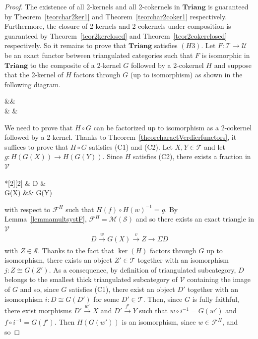 \documentclass[11pt,reqno,a4paper]{amsart}
\theoremstyle{definition}
\theoremstyle{remark}
\def\nameit#1{\textrm{#1}~}
\def\thex{\nameit{Theorem}}
\def\lemx{\nameit{Lemma}}
\newcommand{\M}{\mathcal{M}}
\newcommand{\T}{\mathcal{T}}
\renewcommand{\S}{\mathcal{S}}
\newcommand{\U}{\mathcal{U}}
\newcommand{\V}{\mathcal{V}}
\newcommand{\F}{\mathcal{F}}
\newcommand{\0}{\mathbf{0}}
\renewcommand{\1}{\mathbf{1}}
\newcommand{\Triang}{\mathbf{Triang}}
\def\:{\colon}
\def\c{\circ}
\newcommand{\iso}{\cong}
\newcommand{\aar}[2][]{\xrightarrow[#1]{#2}}
\newcommand{\aiso}[1]{\overset{#1}{\iso}}
\begin{document}
\begin{proof}
    The existence of all 2-kernels and all 2-cokernels in $\Triang$ is guaranteed by \thex \ref{teorchar2ker1} and \thex \ref{teorchar2coker1} respectively. Furthermore, the closure of 2-kernels and 2-cokernels under composition is guaranteed by \thex \ref{teor2kerclosed} and \thex \ref{teor2cokerclosed} respectively. So it remains to prove that $\Triang$ satisfies $(H3)$. Let $F\:\T \to \U$ be an exact functor between triangulated categories such that $F$ is isomorphic in $\Triang$ to the composite of a 2-kernel $G$ followed by a 2-cokernel $H$ and suppose that the 2-kernel of $H$ factors through $G$ (up to isomorphism) as shown in the following diagram.
        \begin{cd}
            \S \&\& \\[-1ex]
	\T \arrow[rr, bend right=40, "F"'] \& \V \& \U
	\arrow[dashed, from=1-1, to=2-1]
	\arrow["{\ker(H)}"{inner sep=0.3ex}, from=1-1, to=2-2]
	\arrow["G", tail, from=2-1, to=2-2]
	\arrow[shift left=5,xshift=-2ex,iso, from=2-1, to=2-2]
	\arrow[shift right=5,iso,from=2-1, to=2-3]
	\arrow["H", two heads, from=2-2, to=2-3]
        \end{cd}
    We need to prove that $H\c G$ can be factorized up to isomorphism as a 2-cokernel followed by a 2-kernel. Thanks to \thex \ref{theorcharactVerdierfunctors}, it suffices to prove that $H\c G$ satisfies (C1) and (C2). Let $X,Y\in \T$ and let $g\:H(G(X)) \to H(G(Y))$. Since $H$ satisfies (C2), there exists a fraction in $\V$ \begin{cd}*[2][2] \& D \& \\[-2ex]
	G(X) \&\& G(Y)
	\arrow["w"', from=1-2, to=2-1]
	\arrow["f", from=1-2, to=2-3]\end{cd} with respect to $\F^{H}$ such that $H(f)\c H(w)^{-1}=g$. By \lemx \ref{lemmamultsystF}, $\F^H=\M(\S)$ and so there exists an exact triangle in $\V$
    $$D \aar{w} G(X) \aar{v} Z \aar{} \Sigma D$$
    with $Z\in \S$. Thanks to the fact that $\ker(H)$ factors through $G$ up to isomorphism, there exists an object $Z'\in \T$ together with an isomorphism $j\: Z \aiso{} G(Z')$. As a consequence, by definition of triangulated subcategory, $D$ belongs to the smallest thick triangulated subcategory of $\V$ containing the image of $G$ and so, since $G$ satisfies (C1), there exist an object $D'$ together with an isomorphism $i\:D\iso G(D')$ for some $D'\in \T$. Then, since $G$ is fully faithful, there exist morphisms $D' \aar{w'} X$ and $D'\aar{f'} Y$ such that $w\c i^{-1}=G(w')$ and $f \c i^{-1}=G(f')$. Then $H(G(w'))$ is an isomorphism, since $w\in \F^H$, and so

\end{proof}
\end{document}
